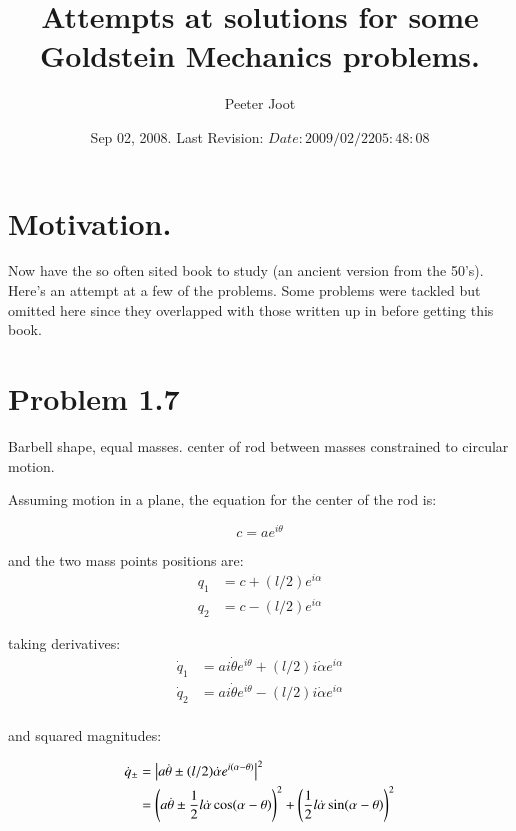 \documentclass{article}
\title{Attempts at solutions for some Goldstein Mechanics problems.}
\author{Peeter Joot}
\date{ Sep 02, 2008.  Last Revision: $Date: 2009/02/22 05:48:08 $ }
\newcommand{\Abs}[1]{\left\lvert{#1}\right\rvert}
\newcommand{\qdot}[0]{\dot{q}}
\newcommand{\dotalpha}[0]{\dot{\alpha}}
\newcommand{\dottheta}[0]{\dot{\theta}}
\begin{document}
             

\maketitle{}

\section{ Motivation. }

Now have the so often sited \cite{goldstein1951cm} book to study (an ancient
version from the 50's).  Here's an attempt at a few of the problems.  Some
problems were tackled but omitted here since they overlapped with those written up in
\cite{PJTongMf1} before getting this book.

\section{ Problem 1.7 }

Barbell shape, equal masses.  center of rod between masses constrained to circular motion.

Assuming motion in a plane, the equation for the center of the rod is:

\begin{equation*}
c = a e^{i\theta}
\end{equation*}

and the two mass points positions are:
\begin{align*}
q_1 &= c + (l/2) e^{i\alpha} \\
q_2 &= c - (l/2) e^{i\alpha}
\end{align*}

taking derivatives:
\begin{align*}
\qdot_1 &= a i \dottheta e^{i\theta} + (l/2) i \dotalpha e^{i\alpha} \\
\qdot_2 &= a i \dottheta e^{i\theta} - (l/2) i \dotalpha e^{i\alpha} \\
\end{align*}

and squared magnitudes:

\begin{align*}
\qdot_{\pm}
&= \Abs{a \dottheta \pm (l/2) \dotalpha e^{i(\alpha - \theta)}}^2 \\
&= \left(a \dottheta   \pm   \inv{2} l \dotalpha \cos(\alpha - \theta)\right)^2 + \left(\inv{2} l \dotalpha \sin(\alpha - \theta)\right)^2
\end{align*}
\end{document}
